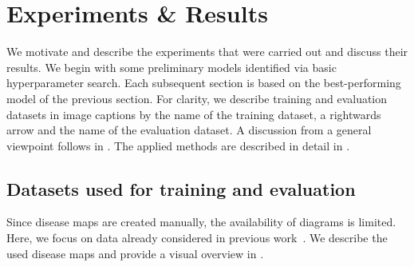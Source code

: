 \documentclass[
	fontsize=10pt, %
	twoside=true, %
	secnumdepth=1, %
  toc=indentunnumbered %
]{kaobook}
\begin{document}





% 



\chapter{Experiments \& Results}
\label{sec:experiments-results}

We motivate and describe the experiments that were carried out and discuss their
results. We begin with some preliminary models identified via basic
hyperparameter search. Each subsequent section is based on the best-performing
model of the previous section. For clarity, we describe training and evaluation
datasets in image captions by the name of the training dataset, a rightwards
arrow and the name of the evaluation dataset.
%
A discussion from a general viewpoint follows in
. The applied methods are described in detail in
.

\section{Datasets used for training and evaluation}%
\label{sec:datasets-used}

Since disease maps are created manually, the availability of diagrams is
limited.
Here, we focus on data already considered in previous work~\cite{nielsen_MachineLearningSupport_2019}. We describe the used disease maps
and provide a visual overview in .
\end{document}
